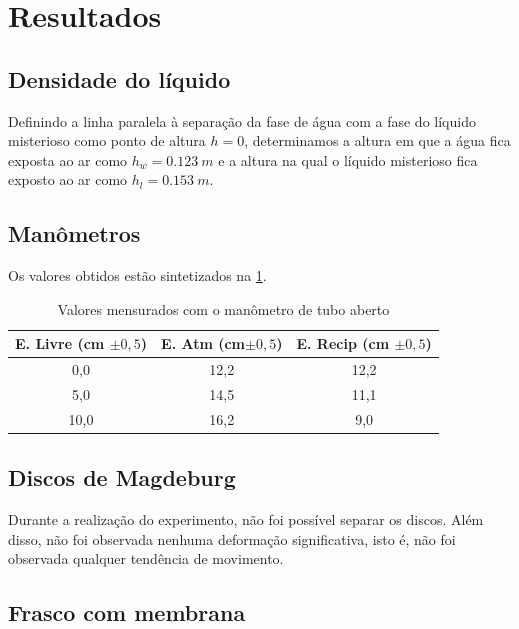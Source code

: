 \section{Resultados}
\subsection{Densidade do líquido}
Definindo a linha paralela à separação da fase de água com a fase do líquido
misterioso como ponto de altura \(h = 0\), determinamos a altura em que a
água fica exposta ao ar como \(h_w = \qty{0,123}{m}\) e a altura na qual o
líquido misterioso fica exposto ao ar como \(h_l = \qty{0,153}{m}\). 

\subsection{Manômetros}

Os valores obtidos estão sintetizados na \cref{tab_man}.

\begin{table}[H]
    \centering
    \begin{tabular}{c | c | c}
        \hline
        \textbf{E. Livre (cm \(\pm 0,5\))} & \textbf{E. Atm (cm\(\pm 0,5\))} & \textbf{E. Recip (cm \(\pm0,5\))}\\
        \hline
        0,0 & 12,2 & 12,2\\
        \hline
        5,0 & 14,5 & 11,1\\
        \hline
        10,0 & 16,2 & 9,0\\
        \hline
    \end{tabular}
    \caption{Valores mensurados com o manômetro de tubo aberto}
    \label{tab_man}
\end{table}

\subsection{Discos de Magdeburg}

Durante a realização do experimento, não foi possível separar os discos. Além
disso, não foi observada nenhuma deformação significativa, isto é, não foi
observada qualquer tendência de movimento. 

\subsection{Frasco com membrana}

